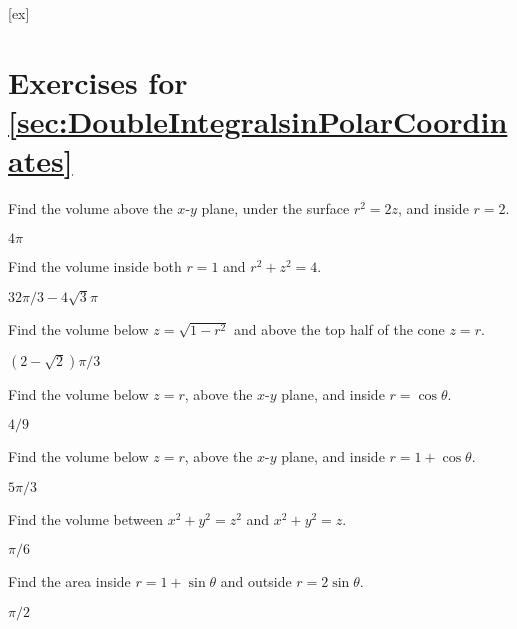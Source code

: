 [ex]
\section*{Exercises for \ref{sec:DoubleIntegralsinPolarCoordinates}}

\begin{enumialphparenastyle}

\begin{ex}
Find the volume above the $x$-$y$ plane, under the surface
$r^2=2z$, and inside $r=2$.
\begin{sol}
$4\pi$
\end{sol}
\end{ex}

\begin{ex}
Find the volume inside both $r=1$ and $r^2+z^2=4$.
\begin{sol}
$32\pi/3-4\sqrt3\pi$
\end{sol}
\end{ex}

\begin{ex}
Find the volume below $z=\sqrt{1-r^2}$ and above
the top half of the cone $z=r$.
\begin{sol}
$(2-\sqrt2)\pi/3$
\end{sol}
\end{ex}

\begin{ex}
Find the volume below  $z=r$, above the $x$-$y$ plane, and
inside $r=\cos\theta$.
\begin{sol}
$4/9$
\end{sol}
\end{ex}

\begin{ex}
Find the volume below  $z=r$, above the $x$-$y$ plane, and
inside $r=1+\cos\theta$.
\begin{sol}
$5\pi/3$
\end{sol}
\end{ex}

\begin{ex}
Find the volume between $x^2+y^2=z^2$ and $x^2+y^2=z$.
\begin{sol}
$\pi/6$
\end{sol}
\end{ex}

\begin{ex}
Find the area inside $r=1+\sin\theta$ and outside
$r=2\sin\theta$. 
\begin{sol}
$\pi/2$
\end{sol}
\end{ex}


\end{enumialphparenastyle}
